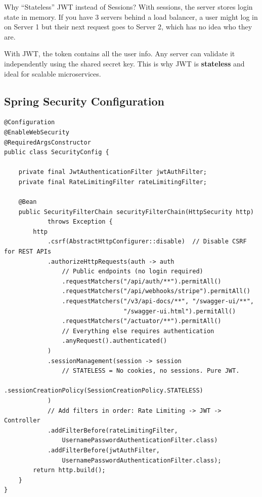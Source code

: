 \documentclass[11pt, a4paper]{article}
\begin{document}
\begin{interviewbox}{Why ``Stateless'' JWT instead of Sessions?}
With sessions, the server stores login state in memory. If you have 3 servers behind a load balancer, a user might log in on Server 1 but their next request goes to Server 2, which has no idea who they are.

With JWT, the token contains all the user info. Any server can validate it independently using the shared secret key. This is why JWT is \textbf{stateless} and ideal for scalable microservices.
\end{interviewbox}

\subsection{Spring Security Configuration}

\begin{lstlisting}[caption={SecurityConfig.java -- Defining Access Rules}]
@Configuration
@EnableWebSecurity
@RequiredArgsConstructor
public class SecurityConfig {

    private final JwtAuthenticationFilter jwtAuthFilter;
    private final RateLimitingFilter rateLimitingFilter;

    @Bean
    public SecurityFilterChain securityFilterChain(HttpSecurity http)
            throws Exception {
        http
            .csrf(AbstractHttpConfigurer::disable)  // Disable CSRF for REST APIs
            .authorizeHttpRequests(auth -> auth
                // Public endpoints (no login required)
                .requestMatchers("/api/auth/**").permitAll()
                .requestMatchers("/api/webhooks/stripe").permitAll()
                .requestMatchers("/v3/api-docs/**", "/swagger-ui/**",
                                 "/swagger-ui.html").permitAll()
                .requestMatchers("/actuator/**").permitAll()
                // Everything else requires authentication
                .anyRequest().authenticated()
            )
            .sessionManagement(session -> session
                // STATELESS = No cookies, no sessions. Pure JWT.
                .sessionCreationPolicy(SessionCreationPolicy.STATELESS)
            )
            // Add filters in order: Rate Limiting -> JWT -> Controller
            .addFilterBefore(rateLimitingFilter,
                UsernamePasswordAuthenticationFilter.class)
            .addFilterBefore(jwtAuthFilter,
                UsernamePasswordAuthenticationFilter.class);
        return http.build();
    }
}
\end{lstlisting}
\end{document}
